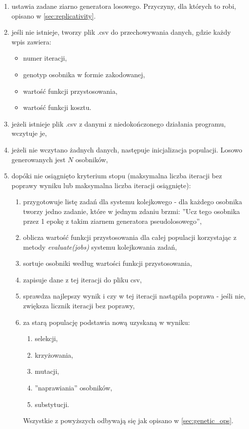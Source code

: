\begin{enumerate}
  \item ustawia zadane ziarno generatora losowego. Przyczyny, dla których to robi, opisano w \ref{sec:replicativity}.
  \item jeśli nie istnieje, tworzy plik .csv do przechowywania danych, gdzie każdy wpis zawiera:
  \begin{itemize}
    \item numer iteracji,
    \item genotyp osobnika w formie zakodowanej,
    \item wartość funkcji przystosowania,
    \item wartość funkcji kosztu.
  \end{itemize}
  \item jeżeli istnieje plik .csv z danymi z niedokończonego działania programu, wczytuje je,
  \item jeżeli nie wczytano żadnych danych, następuje inicjalizacja populacji. Losowo generowanych jest $N$ osobników,
  \item dopóki nie osiągnięto kryterium stopu (maksymalna liczba iteracji bez poprawy wyniku lub maksymalna liczba iteracji osiągnięte):
  \begin{enumerate}
    \item przygotowuje listę zadań dla systemu kolejkowego - dla każdego osobnika tworzy jedno zadanie, które w jednym zdaniu brzmi: ''Ucz tego osobnika przez 1 epokę z takim ziarnem generatora pseudolosowego'',
    \item oblicza wartość funkcji przystosowania dla całej populacji korzystając z metody \textit{evaluate(jobs)} systemu kolejkowania zadań,
    \item sortuje osobniki według wartości funkcji przystosowania,
    \item zapisuje dane z tej iteracji do pliku csv,
    \item sprawdza najlepszy wynik i czy w tej iteracji nastąpiła poprawa - jeśli nie, zwiększa licznik iteracji bez poprawy,
    \item za starą populację podstawia nową uzyskaną w wyniku:
    \begin{enumerate}
      \item selekcji,
      \item krzyżowania,
      \item mutacji,
      \item ''naprawiania'' osobników,
      \item substytucji.
    \end{enumerate}
    Wszystkie z powyższych odbywają się jak opisano w \ref{sec:genetic_ops}.
  \end{enumerate}
\end{enumerate}

